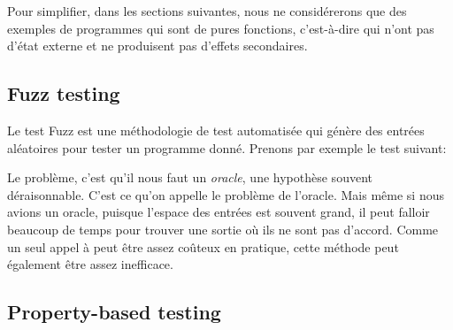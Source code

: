 Pour simplifier, dans les sections suivantes, nous ne considérerons que des exemples de programmes qui sont de pures fonctions, c'est-à-dire qui n'ont pas d'état externe et ne produisent pas d'effets secondaires.

\subsection{Fuzz testing}

Le test Fuzz est une méthodologie de test automatisée qui génère des entrées aléatoires pour tester un programme donné. Prenons par exemple le test suivant:
%
%
Le problème, c'est qu'il nous faut un \textit{oracle}, une hypothèse souvent déraisonnable. C'est ce qu'on appelle le problème de l'oracle. Mais même si nous avions un oracle, puisque l'espace des entrées est souvent grand, il peut falloir beaucoup de temps pour trouver une sortie où ils ne sont pas d'accord. Comme un seul appel à  peut être assez coûteux en pratique, cette méthode peut également être assez inefficace.

\subsection{Property-based testing}\label{subsec:property-based testing}

